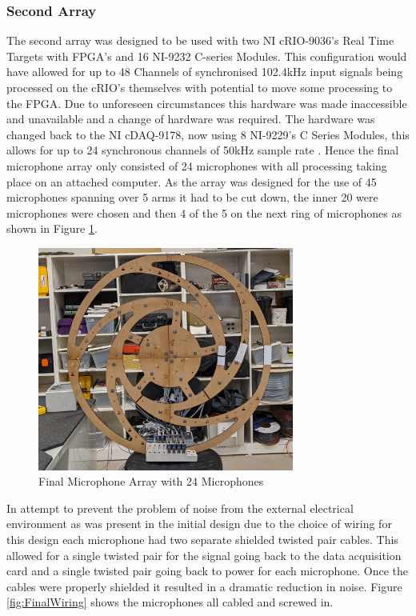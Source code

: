 \documentclass{UoNMCHA}
\numberwithin{equation}{section}
\begin{document}
\subsubsection{Second Array} \label{sec:Second Design DAQ}
    The second array was designed to be used with two NI cRIO-9036's Real Time Targets with FPGA's and 16 NI-9232 C-series Modules. This configuration would have allowed for up to 48 Channels of synchronised 102.4kHz input signals being processed on the cRIO's themselves with potential to move some processing to the FPGA. Due to unforeseen circumstances this hardware was made inaccessible and unavailable and a change of hardware was required. The hardware was changed back to the NI cDAQ-9178, now using 8 NI-9229's C Series Modules, this allows for up to 24 synchronous channels of 50kHz sample rate \citep{NI9229}. Hence the final microphone array only consisted of 24 microphones with all processing taking place on an attached computer. As the array was designed for the use of 45 microphones spanning over 5 arms it had to be cut down, the inner 20 were microphones were chosen and then 4 of the 5 on the next ring of microphones as shown in Figure \ref{fig:FinalBuild}.
    
    \begin{figure} [H]
        \centering
        \includegraphics[keepaspectratio, width = 0.75\textwidth]{Figures/FinalArrayBuilt.png}
        \caption{Final Microphone Array with 24 Microphones}
        \label{fig:FinalBuild}
    \end{figure}

    In attempt to prevent the problem of noise from the external electrical environment as was present in the initial design due to the choice of wiring for this design each microphone had two separate shielded twisted pair cables. This allowed for a single twisted pair for the signal going back to the data acquisition card and a single twisted pair going back to power for each microphone. Once the cables were properly shielded it resulted in a dramatic reduction in noise. Figure \ref{fig:FinalWiring} shows the microphones all cabled and screwed in. 
\end{document}
